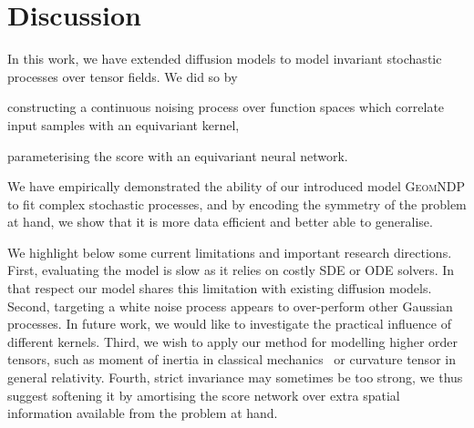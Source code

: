 \section{Discussion}
\label{sec:discussion}

In this work, we have extended diffusion models to model invariant stochastic processes over tensor fields.
We did so by \begin{enumerate*}[label=(\alph*)] \item constructing a continuous noising process over function spaces which correlate input samples with an equivariant kernel, \item parameterising the score with an equivariant neural network.
\end{enumerate*}
We have empirically demonstrated the ability of our introduced model {\scshape GeomNDP } to fit complex stochastic processes, and by encoding the symmetry of the problem at hand, we show that it is more data efficient and better able to generalise.

We highlight below some current limitations and important research directions.
First, evaluating the model is slow as it relies on costly SDE or ODE solvers.
In that respect our model shares this limitation with existing diffusion models.
Second, targeting a white noise process appears to over-perform other Gaussian processes.
In future work, we would like to investigate the practical influence of different kernels.
Third, we wish to apply our method for modelling higher order tensors, such as moment of inertia in classical mechanics~\parencite{thomas2018tensor} or curvature tensor in general relativity.
Fourth, strict invariance may sometimes be too strong, we thus suggest softening it by amortising the score network over extra spatial information available from the problem at hand.
